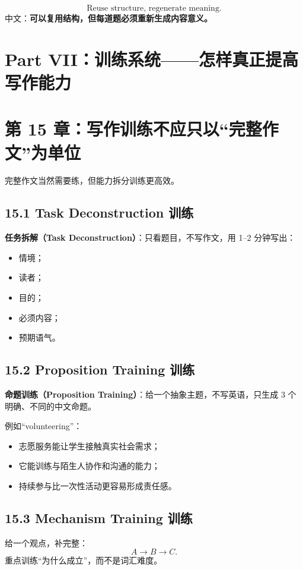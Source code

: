 \documentclass[11pt,a4paper]{ctexart}
\newcommand{\kw}[1]{\textbf{#1}}
\newcommand{\term}[2]{\textbf{#1（#2）}}
\begin{document}
\begin{corebox}[模板使用原则]
\[
\boxed{
\text{Reuse structure, regenerate meaning.}
}
\]
中文：\kw{可以复用结构，但每道题必须重新生成内容意义。}
\end{corebox}

\newpage
\section{Part VII：训练系统——怎样真正提高写作能力}

\section{第 15 章：写作训练不应只以“完整作文”为单位}

完整作文当然需要练，但能力拆分训练更高效。

\subsection{15.1 Task Deconstruction 训练}
\term{任务拆解}{Task Deconstruction}：只看题目，不写作文，用 1--2 分钟写出：
\begin{itemize}
  \item 情境；
  \item 读者；
  \item 目的；
  \item 必须内容；
  \item 预期语气。
\end{itemize}

\subsection{15.2 Proposition Training 训练}
\term{命题训练}{Proposition Training}：给一个抽象主题，不写英语，只生成 3 个明确、不同的中文命题。

例如“volunteering”：
\begin{itemize}
  \item 志愿服务能让学生接触真实社会需求；
  \item 它能训练与陌生人协作和沟通的能力；
  \item 持续参与比一次性活动更容易形成责任感。
\end{itemize}

\subsection{15.3 Mechanism Training 训练}
给一个观点，补完整：
\[
A\rightarrow B\rightarrow C.
\]
重点训练“为什么成立”，而不是词汇难度。
\end{document}
